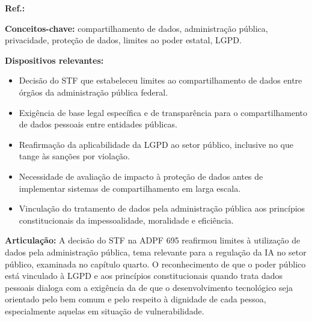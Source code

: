 \begin{fichamento}
    \textbf{Ref.:} \cite{STF2022ADPF695}
    
    \textbf{Conceitos-chave:} compartilhamento de dados, administração pública, privacidade, proteção de dados, limites ao poder estatal, LGPD.
    
    \textbf{Dispositivos relevantes:}
    \begin{itemize}
        \item Decisão do STF que estabeleceu limites ao compartilhamento de dados entre órgãos da administração pública federal.
        \item Exigência de base legal específica e de transparência para o compartilhamento de dados pessoais entre entidades públicas.
        \item Reafirmação da aplicabilidade da LGPD ao setor público, inclusive no que tange às sanções por violação.
        \item Necessidade de avaliação de impacto à proteção de dados antes de implementar sistemas de compartilhamento em larga escala.
        \item Vinculação do tratamento de dados pela administração pública aos princípios constitucionais da impessoalidade, moralidade e eficiência.
    \end{itemize}
    
    \textbf{Articulação:} A decisão do STF na ADPF 695 reafirmou limites à utilização de dados pela administração pública, tema relevante para a regulação da IA no setor público, examinada no capítulo quarto. O reconhecimento de que o poder público está vinculado à LGPD e aos princípios constitucionais quando trata dados pessoais dialoga com a exigência da \MH{} de que o desenvolvimento tecnológico seja orientado pelo bem comum e pelo respeito à dignidade de cada pessoa, especialmente aquelas em situação de vulnerabilidade.
\end{fichamento}

